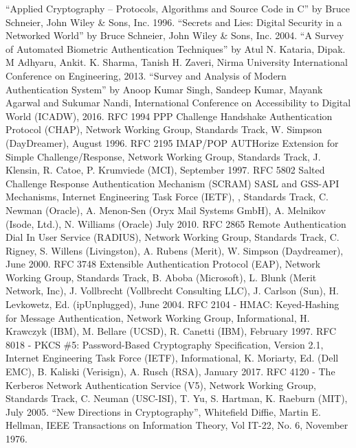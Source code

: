 \begin{multicols}{2}
\begin{thebibliography}{99}
 ``Applied Cryptography -- Protocols, Algorithms and Source Code in C'' by Bruce Schneier, John Wiley \& Sons, Inc. 1996.
 ``Secrets and Lies: Digital Security in a Networked World'' by Bruce Schneier, John Wiley \& Sons, Inc. 2004.
 ``A Survey of Automated Biometric Authentication Techniques'' by Atul N. Kataria, Dipak. M Adhyaru, Ankit. K. Sharma, Tanish H. Zaveri, Nirma University International Conference on Engineering, 2013.
 ``Survey and Analysis of Modern Authentication System'' by Anoop Kumar Singh, Sandeep Kumar, Mayank Agarwal and Sukumar Nandi,  International Conference on Accessibility to Digital World (ICADW), 2016.
 RFC 1994 PPP Challenge Handshake Authentication Protocol (CHAP), Network Working Group, Standards Track, W. Simpson (DayDreamer), August 1996.
 RFC 2195 IMAP/POP AUTHorize Extension for Simple Challenge/Response, Network Working Group, Standards Track, J. Klensin, R. Catoe, P. Krumviede (MCI), September 1997.
 RFC 5802 Salted Challenge Response Authentication Mechanism (SCRAM) SASL and GSS-API Mechanisms, Internet Engineering Task Force (IETF), , Standards Track, C. Newman (Oracle), A. Menon-Sen (Oryx Mail Systems GmbH), A. Melnikov (Isode, Ltd.), N. Williams (Oracle) July 2010.
 RFC 2865 Remote Authentication Dial In User Service (RADIUS), Network Working Group, Standards Track, C. Rigney, S. Willens (Livingston), A. Rubens (Merit), W. Simpson (Daydreamer), June 2000.
 RFC 3748 Extensible Authentication Protocol (EAP), Network Working Group, Standards Track, B. Aboba (Microsoft), L. Blunk (Merit Network, Inc), J. Vollbrecht (Vollbrecht Consulting LLC), J. Carlson (Sun), H. Levkowetz, Ed. (ipUnplugged), June 2004.
 RFC 2104 - HMAC: Keyed-Hashing for Message Authentication, Network Working Group, Informational, H. Krawczyk (IBM), M. Bellare (UCSD), R. Canetti (IBM), February 1997.
 RFC 8018 - PKCS \#5: Password-Based Cryptography Specification, Version 2.1, Internet Engineering Task Force (IETF), Informational, K. Moriarty, Ed. (Dell EMC), B. Kaliski (Verisign), A. Rusch (RSA), January 2017. 
 RFC 4120 - The Kerberos Network Authentication Service (V5), Network Working Group, Standards Track, C. Neuman (USC-ISI), T. Yu, S. Hartman, K. Raeburn (MIT), July 2005.
 ``New Directions in Cryptography'', Whitefield Diffie, Martin E. Hellman, IEEE Transactions on Information Theory, Vol IT-22, No. 6, November 1976.

\end{thebibliography}
\end{multicols}
